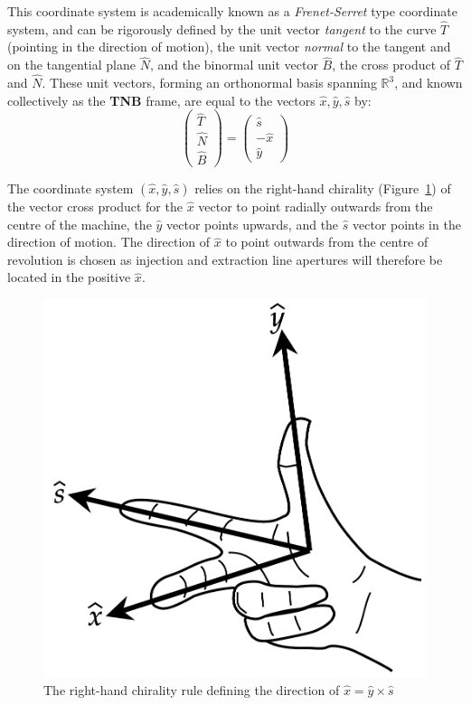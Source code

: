 \documentclass[11pt]{report}
\begin{document}
This coordinate system is academically known as a {\it Frenet-Serret} type coordinate system, and can be rigorously defined by the unit vector {\it tangent} to the curve $\hat T$ (pointing in the direction of motion), the unit vector {\it normal} to the tangent and on the tangential plane $\hat N$, and the binormal unit vector $\hat B$, the cross product of $\hat T$ and $\hat N$. These unit vectors, forming an orthonormal basis spanning $\mathbb{R}^3$, and known collectively as the {\bf TNB} frame, are equal to the vectors $\hat x, \hat y, \hat s$ by:
\begin{equation}
\begin{pmatrix}\hat T\\\hat N\\\hat B \end{pmatrix}=\begin{pmatrix}\hat s\\-\hat x\\\hat y \end{pmatrix}
\end{equation}

The coordinate system $(\hat x, \hat y, \hat s)$ relies on the right-hand chirality (Figure~\ref{fig:rhr}) of the vector cross product for the $\hat x$ vector to point radially outwards from the centre of the machine, the $\hat y$ vector points upwards, and the $\hat s$ vector points in the direction of motion. The direction of $\hat x$ to point outwards from the centre of revolution is chosen as injection and extraction line apertures will therefore be located in the positive $\hat x$.

\begin{figure}[!h]
\begin{center}
\includegraphics[scale=.25]{rhr.pdf}
\caption{The right-hand chirality rule defining the direction of $\hat x = \hat y \times \hat s$}
\label{fig:rhr}
\end{center}
\end{figure}
\end{document}
